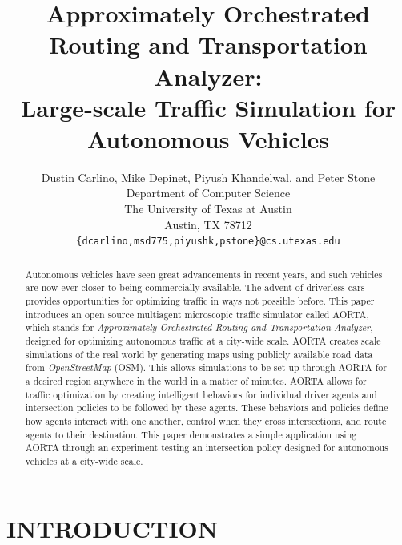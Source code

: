 \documentclass[letterpaper, 10 pt, conference]{ieeeconf}  %
\title{\LARGE \bf
Approximately Orchestrated Routing and Transportation Analyzer:\\
Large-scale Traffic Simulation for Autonomous Vehicles
}
\author{Dustin Carlino, Mike Depinet, Piyush Khandelwal, and Peter Stone\\
        Department of Computer Science\\
        The University of Texas at Austin\\
        Austin, TX 78712\\
        {\tt \small\{dcarlino,msd775,piyushk,pstone\}@cs.utexas.edu}}
\begin{document}
\maketitle
\thispagestyle{empty}
\pagestyle{empty}


\begin{abstract} 

Autonomous vehicles have seen great advancements in recent years, and such
vehicles are now ever closer to being commercially available. The advent of
driverless cars provides opportunities for optimizing traffic in ways not
possible before. This paper introduces an open source multiagent microscopic
traffic simulator called AORTA, which stands for \textit{Approximately
Orchestrated Routing and Transportation Analyzer}, designed for optimizing
autonomous traffic at a city-wide scale. AORTA creates scale simulations of the
real world by generating maps using publicly available road data from
\textit{OpenStreetMap} (OSM). This allows simulations to be set up through AORTA
for a desired region anywhere in the world in a matter of minutes. AORTA allows
for traffic optimization by creating intelligent behaviors for individual driver
agents and intersection policies to be followed by these agents. These behaviors
and policies define how agents interact with one another, control when they
cross intersections, and route agents to their destination. This paper
demonstrates a simple application using AORTA through an experiment testing an
intersection policy designed for autonomous vehicles at a city-wide scale.

\end{abstract}


\section{INTRODUCTION}
\label{sec:introduction}

\end{document}
